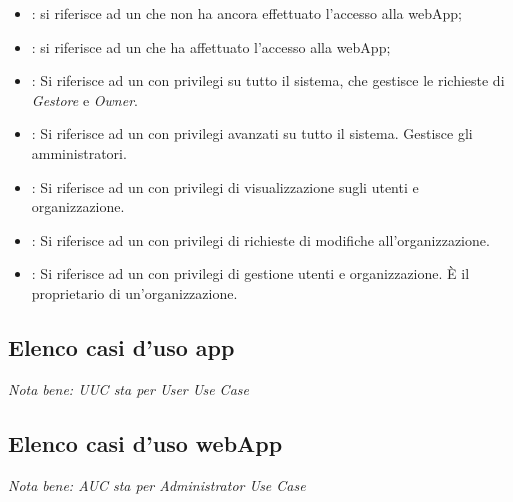 \documentclass[../analisi-dei-requisiti]{subfiles}
\begin{document}
\begin{itemize}
  \item \textbf{}: si riferisce ad un  che non ha ancora effettuato l'accesso alla webApp;
  \item \textbf{}: si riferisce ad un  che ha affettuato l'accesso alla webApp;
  \item \textbf{}: Si riferisce ad un  con privilegi su tutto il sistema, che gestisce le richieste di \emph{Gestore} e \emph{Owner}.
  \item \textbf{}: Si riferisce ad un  con privilegi avanzati su tutto il sistema. Gestisce gli amministratori.
  \item \textbf{}: Si riferisce ad un  con privilegi di visualizzazione sugli utenti e organizzazione.
  \item \textbf{}: Si riferisce ad un  con privilegi di richieste di modifiche all'organizzazione.
  \item \textbf{}: Si riferisce ad un  con privilegi di gestione utenti e organizzazione. È il proprietario di un'organizzazione.
\end{itemize}


\subsection{Elenco casi d'uso app}%
\label{sub:casi_duso_app}
\emph{Nota bene: UUC sta per User Use Case}

\subsection{Elenco casi d'uso webApp}%
\label{sub:casi_duso_webApp}
\emph{Nota bene: AUC sta per Administrator Use Case}

\end{document}
